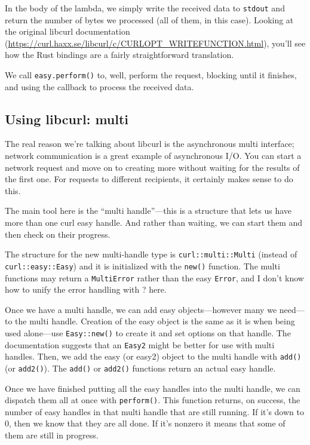 \documentclass[a4paper]{report}
\begin{document}
In the body of the lambda, we simply write the received data to \texttt{stdout}
and return the number of bytes we processed (all of them, in this case).
Looking at the original libcurl documentation (\url{https://curl.haxx.se/libcurl/c/CURLOPT_WRITEFUNCTION.html}), you'll see how the Rust bindings
are a fairly straightforward translation.

We call \texttt{easy.perform()} to, well, perform the request, blocking until
it finishes, and using the callback to process the received data.

\subsection*{Using libcurl: multi}
The real reason we're talking about libcurl is the asynchronous multi interface;
network communication is a great example of asynchronous  I/O.
You can start a network request and move on to creating more without waiting for the results of the first one. For requests to different recipients, it certainly makes sense to do this.

The main tool here is the ``multi handle''---this is a structure that lets us have more than one curl easy handle. And rather than waiting, we can start them and then check on their progress. 

The structure for the new multi-handle type is \texttt{curl::multi::Multi} (instead of \texttt{curl::easy::Easy}) and it is initialized with the \texttt{new()} function. The multi functions may return a \texttt{MultiError} rather than the easy \texttt{Error}, and I don't know how to unify the error handling with ? here.

Once we have a multi handle, we can add easy objects---however many we need---to the multi handle. Creation of the easy object is the same as it is when being used alone---use \texttt{Easy::new()} to create it and set options on that handle. The documentation suggests that an \texttt{Easy2} might be better for use with multi handles. Then, we add the easy (or easy2) object to the multi handle with \texttt{add()} (or \texttt{add2()}). The \texttt{add()} or \texttt{add2()} functions return an actual easy handle.

Once we have finished putting all the easy handles into the multi handle, we can dispatch them all at once with \texttt{perform()}. This function returns, on success, the number of easy handles in that multi handle that are still running. If it's down to 0, then we know that they are all done. If it's nonzero it means that some of them are still in progress.
\end{document}
